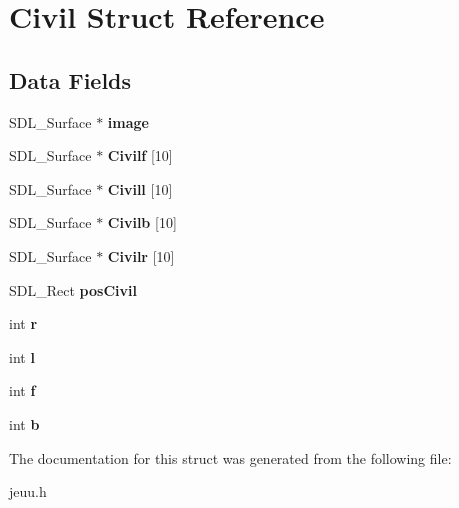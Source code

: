 \hypertarget{structCivil}{}\section{Civil Struct Reference}
\label{structCivil}
\subsection*{Data Fields}
\begin{DoxyCompactItemize}
\item 
S\+D\+L\+\_\+\+Surface $\ast$ {\bfseries image}\hypertarget{structCivil_aac343d35d414684f7aa2fc7d7a7a0d65}{}\label{structCivil_aac343d35d414684f7aa2fc7d7a7a0d65}

\item 
S\+D\+L\+\_\+\+Surface $\ast$ {\bfseries Civilf} \mbox{[}10\mbox{]}\hypertarget{structCivil_ab64159839ab200d7a4da10c0301f55bb}{}\label{structCivil_ab64159839ab200d7a4da10c0301f55bb}

\item 
S\+D\+L\+\_\+\+Surface $\ast$ {\bfseries Civill} \mbox{[}10\mbox{]}\hypertarget{structCivil_a162ce0c09885b043db811e544b4f65ed}{}\label{structCivil_a162ce0c09885b043db811e544b4f65ed}

\item 
S\+D\+L\+\_\+\+Surface $\ast$ {\bfseries Civilb} \mbox{[}10\mbox{]}\hypertarget{structCivil_a313707dd6316edbeea50af4ceb6c0ce2}{}\label{structCivil_a313707dd6316edbeea50af4ceb6c0ce2}

\item 
S\+D\+L\+\_\+\+Surface $\ast$ {\bfseries Civilr} \mbox{[}10\mbox{]}\hypertarget{structCivil_aaea46579d7d8f628f6672d4620b7c3c1}{}\label{structCivil_aaea46579d7d8f628f6672d4620b7c3c1}

\item 
S\+D\+L\+\_\+\+Rect {\bfseries pos\+Civil}\hypertarget{structCivil_a681cfd9e7297a7281bf48ad3f61f44f1}{}\label{structCivil_a681cfd9e7297a7281bf48ad3f61f44f1}

\item 
int {\bfseries r}\hypertarget{structCivil_a99ad2e05879fefa99e22329387d094b0}{}\label{structCivil_a99ad2e05879fefa99e22329387d094b0}

\item 
int {\bfseries l}\hypertarget{structCivil_a6bd91681cdc1a55c0c46dcfb934b3dda}{}\label{structCivil_a6bd91681cdc1a55c0c46dcfb934b3dda}

\item 
int {\bfseries f}\hypertarget{structCivil_ae697860a3575b4bec4631772d70b7f01}{}\label{structCivil_ae697860a3575b4bec4631772d70b7f01}

\item 
int {\bfseries b}\hypertarget{structCivil_a3e250b4dff1f11e9ac1aec12962095a5}{}\label{structCivil_a3e250b4dff1f11e9ac1aec12962095a5}

\end{DoxyCompactItemize}


The documentation for this struct was generated from the following file\+:\begin{DoxyCompactItemize}
\item 
jeuu.\+h\end{DoxyCompactItemize}
